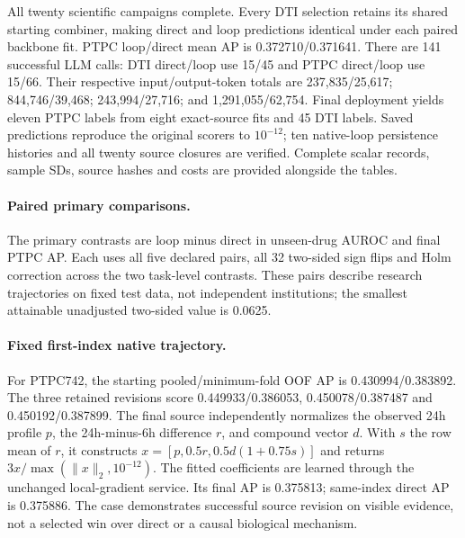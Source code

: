 \begin{table}[ht]

\end{table}

All twenty scientific campaigns complete. Every DTI selection retains its shared starting combiner, making direct and loop predictions identical under each paired backbone fit. PTPC loop/direct mean AP is 0.372710/0.371641. There are 141 successful LLM calls: DTI direct/loop use 15/45 and PTPC direct/loop use 15/66. Their respective input/output-token totals are 237,835/25,617; 844,746/39,468; 243,994/27,716; and 1,291,055/62,754. Final deployment yields eleven PTPC labels from eight exact-source fits and 45 DTI labels. Saved predictions reproduce the original scorers to $10^{-12}$; ten native-loop persistence histories and all twenty source closures are verified. Complete scalar records, sample SDs, source hashes and costs are provided alongside the tables.

\paragraph{Paired primary comparisons.}
The primary contrasts are loop minus direct in unseen-drug AUROC and final PTPC AP. Each uses all five declared pairs, all 32 two-sided sign flips and Holm correction across the two task-level contrasts. These pairs describe research trajectories on fixed test data, not independent institutions; the smallest attainable unadjusted two-sided value is 0.0625.

\begingroup\footnotesize\setlength{\tabcolsep}{3pt}

\endgroup

\paragraph{Fixed first-index native trajectory.}
For PTPC742, the starting pooled/minimum-fold OOF AP is 0.430994/0.383892. The three retained revisions score 0.449933/0.386053, 0.450078/0.387487 and 0.450192/0.387899. The final source independently normalizes the observed 24h profile $p$, the 24h-minus-6h difference $r$, and compound vector $d$. With $s$ the row mean of $r$, it constructs $x=[p,0.5r,0.5d(1+0.75s)]$ and returns $3x/\max(\lVert x\rVert_2,10^{-12})$. The fitted coefficients are learned through the unchanged local-gradient service. Its final AP is 0.375813; same-index direct AP is 0.375886. The case demonstrates successful source revision on visible evidence, not a selected win over direct or a causal biological mechanism.

